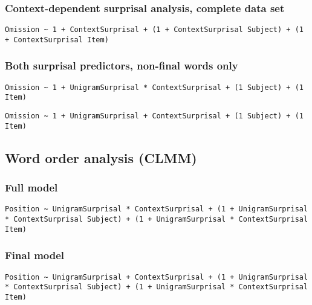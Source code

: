 
\subsubsection*{Context-dependent surprisal analysis, complete data set}
\texttt{Omission \textasciitilde {} 1 + ContextSurprisal + (1 + ContextSurprisal  {}\textbar {} Subject) + (1 + ContextSurprisal  {}\textbar {} Item)}

\subsubsection*{Both surprisal predictors, non-final words only}
\texttt{Omission \textasciitilde {} 1 + UnigramSurprisal * ContextSurprisal + (1  {}\textbar {} Subject) + (1  {}\textbar {} Item) }

\texttt{Omission \textasciitilde {} 1 + UnigramSurprisal + ContextSurprisal + (1  {}\textbar {} Subject) + (1  {}\textbar {} Item)}

\subsection*{Word order analysis (CLMM)}
\subsubsection*{Full model}
\texttt{Position \textasciitilde {} UnigramSurprisal * ContextSurprisal + (1 + UnigramSurprisal * ContextSurprisal  {}\textbar {} Subject) + (1 + UnigramSurprisal * ContextSurprisal  {}\textbar {} Item)}

\subsubsection*{Final model}
\texttt{Position \textasciitilde {} UnigramSurprisal + ContextSurprisal + (1 + UnigramSurprisal * ContextSurprisal  {}\textbar {} Subject) + (1 + UnigramSurprisal * ContextSurprisal  {}\textbar {} Item)}

